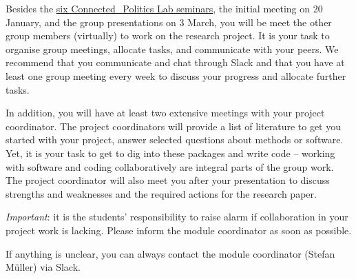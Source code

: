 \documentclass[abstract=on,parskip=full,headings=standardclasses,fontsize=11pt,paper=a4]{scrartcl}
\begin{document}
Besides the \href{https://www.ucd.ie/connected_politics/events/}{six Connected\_Politics Lab seminars}, the initial meeting on 20 January, and the group presentations on 3 March, you will be meet the other group members (virtually) to work on  the research project. It is your task to organise group meetings, allocate tasks, and communicate with your peers. We recommend that you communicate and chat through Slack and that you have at least one  group meeting  every week to discuss your progress and allocate further tasks. 


 In addition, you will have at least two extensive meetings with your project coordinator. The project coordinators will provide a list of literature to get you started with your project, answer selected questions about methods or software. Yet, it is your task to get to dig into these packages and write code -- working with software and coding collaboratively are integral parts of the group work. The project coordinator will also meet you after your presentation to discuss strengths and weaknesses and the required actions for the research paper.


\textit{Important}: it is the students' responsibility to raise alarm if collaboration in your project work is lacking. Please inform the module coordinator as soon as possible.


If anything is unclear, you can always contact the module coordinator (Stefan Müller) via Slack.
\end{document}
